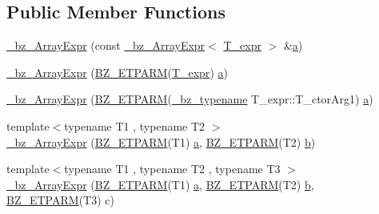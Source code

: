 \subsection*{Public Member Functions}
\begin{DoxyCompactItemize}
\item 
\hyperlink{class__bz__ArrayExpr_a798202a02843e29f1469ae67d1d12f77}{\+\_\+bz\+\_\+\+Array\+Expr} (const \hyperlink{class__bz__ArrayExpr}{\+\_\+bz\+\_\+\+Array\+Expr}$<$ \hyperlink{class__bz__ArrayExpr_a1675ef17c504a89b9bc1e8ddf4e875c2}{T\+\_\+expr} $>$ \&\hyperlink{gen__mat5files_8m_aae328bf20413f220e38aec4d95bfd6da}{a})
\item 
\hyperlink{class__bz__ArrayExpr_ad8b2cd64c2341edcd6fe81f39b84187d}{\+\_\+bz\+\_\+\+Array\+Expr} (\hyperlink{tuning_8h_a92a6f3aa8f4cd5ac9b4239c449892bb7}{B\+Z\+\_\+\+E\+T\+P\+A\+R\+M}(\hyperlink{class__bz__ArrayExpr_a1675ef17c504a89b9bc1e8ddf4e875c2}{T\+\_\+expr}) \hyperlink{gen__mat5files_8m_aae328bf20413f220e38aec4d95bfd6da}{a})
\item 
\hyperlink{class__bz__ArrayExpr_a2899267d03aec5932012115542ea0d71}{\+\_\+bz\+\_\+\+Array\+Expr} (\hyperlink{tuning_8h_a92a6f3aa8f4cd5ac9b4239c449892bb7}{B\+Z\+\_\+\+E\+T\+P\+A\+R\+M}(\hyperlink{compiler_8h_a1bc40add3e72effc9cf69dbe445cbdfd}{\+\_\+bz\+\_\+typename} T\+\_\+expr\+::\+T\+\_\+ctor\+Arg1) \hyperlink{gen__mat5files_8m_aae328bf20413f220e38aec4d95bfd6da}{a})
\item 
{\footnotesize template$<$typename T1 , typename T2 $>$ }\\\hyperlink{class__bz__ArrayExpr_a3e1e7b02cc0ec1854dd787bf72e1ed37}{\+\_\+bz\+\_\+\+Array\+Expr} (\hyperlink{tuning_8h_a92a6f3aa8f4cd5ac9b4239c449892bb7}{B\+Z\+\_\+\+E\+T\+P\+A\+R\+M}(T1) \hyperlink{gen__mat5files_8m_aae328bf20413f220e38aec4d95bfd6da}{a}, \hyperlink{tuning_8h_a92a6f3aa8f4cd5ac9b4239c449892bb7}{B\+Z\+\_\+\+E\+T\+P\+A\+R\+M}(T2) \hyperlink{gen__mat5files_8m_a7b38767b3b6a8dae167e5afa4fc340b0}{b})
\item 
{\footnotesize template$<$typename T1 , typename T2 , typename T3 $>$ }\\\hyperlink{class__bz__ArrayExpr_a0ae5a93c0428001b4bde11bda53b272c}{\+\_\+bz\+\_\+\+Array\+Expr} (\hyperlink{tuning_8h_a92a6f3aa8f4cd5ac9b4239c449892bb7}{B\+Z\+\_\+\+E\+T\+P\+A\+R\+M}(T1) \hyperlink{gen__mat5files_8m_aae328bf20413f220e38aec4d95bfd6da}{a}, \hyperlink{tuning_8h_a92a6f3aa8f4cd5ac9b4239c449892bb7}{B\+Z\+\_\+\+E\+T\+P\+A\+R\+M}(T2) \hyperlink{gen__mat5files_8m_a7b38767b3b6a8dae167e5afa4fc340b0}{b}, \hyperlink{tuning_8h_a92a6f3aa8f4cd5ac9b4239c449892bb7}{B\+Z\+\_\+\+E\+T\+P\+A\+R\+M}(T3) c)

\end{DoxyCompactItemize}
